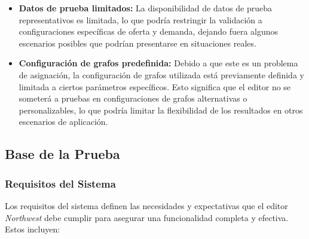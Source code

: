 \documentclass[stu, 12pt, letterpaper, donotrepeattitle, floatsintext, natbib]{apa7}
\begin{document}
\begin{itemize}
    \item \textbf{Datos de prueba limitados:} La disponibilidad de datos de prueba representativos es limitada, lo que podría restringir la validación a configuraciones específicas de oferta y demanda, dejando fuera algunos escenarios posibles que podrían presentarse en situaciones reales.

    \item \textbf{Configuración de grafos predefinida:} Debido a que este es un problema de asignación, la configuración de grafos utilizada está previamente definida y limitada a ciertos parámetros específicos. Esto significa que el editor no se someterá a pruebas en configuraciones de grafos alternativas o personalizables, lo que podría limitar la flexibilidad de los resultados en otros escenarios de aplicación.
\end{itemize}

\subsection{Base de la Prueba}

\subsubsection{Requisitos del Sistema}
Los requisitos del sistema definen las necesidades y expectativas que el editor \textit{Northwest} debe cumplir para asegurar una funcionalidad completa y efectiva. Estos incluyen:
\end{document}
